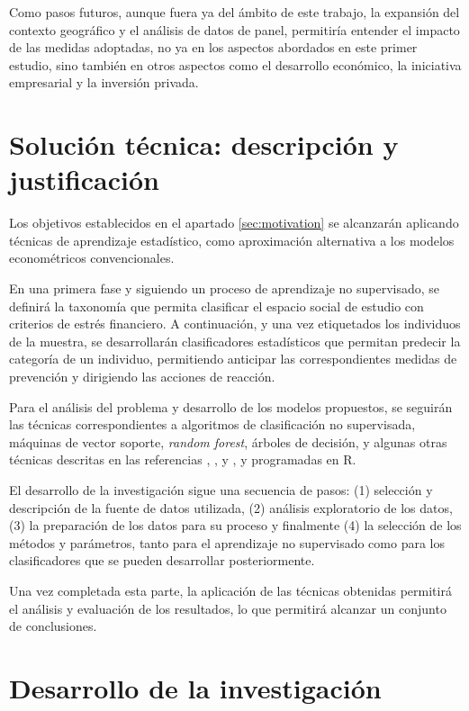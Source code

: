 \documentclass[a4paper, 11pt]{article}
\begin{document}
Como pasos futuros, aunque fuera ya del ámbito de este trabajo, la expansión del contexto
geográfico y el análisis de datos de panel, permitiría entender el impacto de las medidas 
adoptadas, no ya en los aspectos abordados en este primer estudio, sino también en otros 
aspectos como el desarrollo económico, la iniciativa empresarial y la inversión privada. 

\section{Solución técnica: descripción y justificación }
\label{sec:technical_proposal}
Los objetivos establecidos en el apartado \ref{sec:motivation} se alcanzarán aplicando técnicas 
de aprendizaje estadístico, como aproximación alternativa a los modelos econométricos 
convencionales. 

En una primera fase y siguiendo un proceso de aprendizaje no supervisado, se definirá la taxonomía que permita clasificar el espacio social de estudio con criterios de estrés
financiero. A continuación, y una vez etiquetados los individuos de la muestra, se
desarrollarán clasificadores estadísticos que permitan predecir la categoría de un 
individuo, permitiendo anticipar las correspondientes medidas de prevención y dirigiendo las 
acciones de reacción. 

Para el análisis del problema y desarrollo de los modelos propuestos, se seguirán las 
técnicas correspondientes a algoritmos de clasificación no supervisada, máquinas de vector 
soporte, \textit{random forest},  árboles de decisión, y algunas otras técnicas descritas en las referencias \cite{lantz23}, \cite{Hastie23}, \cite{aurelien17} y \cite{Hastie13}, y programadas
en R\cite{R24}. 

El desarrollo de la investigación sigue una secuencia de pasos: (1) selección y descripción 
de la fuente de datos utilizada, (2) análisis exploratorio de los datos, (3) la 
preparación de los datos para su proceso y finalmente (4) la selección de los métodos y parámetros, tanto para el aprendizaje no supervisado como
para los clasificadores que se pueden desarrollar posteriormente.

Una vez completada esta parte, la aplicación de
las técnicas obtenidas permitirá el análisis y evaluación de los resultados, lo que permitirá
alcanzar un conjunto de conclusiones.

\section{Desarrollo de la investigación}
\label{sec:research}
\end{document}
